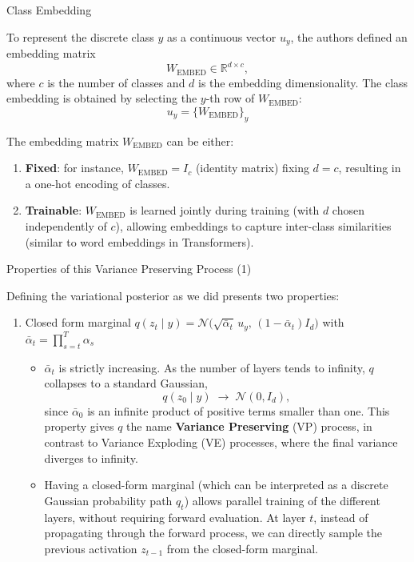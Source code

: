 \documentclass{beamer}
\begin{document}
\begin{frame}{Class Embedding}

To represent the discrete class \(y\) as a continuous vector \(u_y\), the authors defined an embedding matrix
\[
W_{\mathrm{EMBED}} \in \mathbb{R}^{d \times c},
\]
where \(c\) is the number of classes and \(d\) is the embedding dimensionality. The class embedding is obtained by selecting the \(y\)-th row of \(W_{\mathrm{EMBED}}\):
\[
u_y = \{W_{\mathrm{EMBED}}\}_y
\]

The embedding matrix \(W_{\mathrm{EMBED}}\) can be either:

\begin{enumerate}
  \item \textbf{Fixed}: for instance, \(W_{\mathrm{EMBED}} = I_c\) (identity matrix) fixing \(d = c\), resulting in a one-hot encoding of classes.
  \item \textbf{Trainable}: \(W_{\mathrm{EMBED}}\) is learned jointly during training (with \(d\) chosen independently of \(c\)), allowing embeddings to capture inter-class similarities (similar to word embeddings in Transformers).
\end{enumerate}

\end{frame}






\begin{frame}{Properties of this Variance Preserving Process (1)}

Defining the variational posterior as we did presents two properties:

\begin{enumerate}
    \item Closed form marginal $ q(z_{t} \mid y) = \mathcal{N}\big(\sqrt{\bar\alpha_{t}} \, u_y, \, (1-\bar\alpha_{t}) I_d\big) $
    with $\bar\alpha_{t} = \prod^T_{s=t} \alpha_s$
\begin{itemize}
    \item $\bar\alpha_{t}$ is strictly increasing. As the number of layers tends to infinity, $q$ collapses to a standard Gaussian, 
    \[
        q(z_{0} \mid y) \;\rightarrow\; \mathcal{N}(0, I_d),
    \]
    since $\bar\alpha_{0}$ is an infinite product of positive terms smaller than one. This property gives $q$ the name \textbf{Variance Preserving} (VP) process, in contrast to Variance Exploding (VE) processes, where the final variance diverges to infinity.

    \item Having a closed-form marginal (which can be interpreted as a discrete Gaussian probability path $q_t$) allows parallel training of the different layers, without requiring forward evaluation. At layer $t$, instead of propagating through the forward process, we can directly sample the previous activation $z_{t-1}$ from the closed-form marginal.
\end{itemize}


\end{enumerate}


\end{frame}
\end{document}
